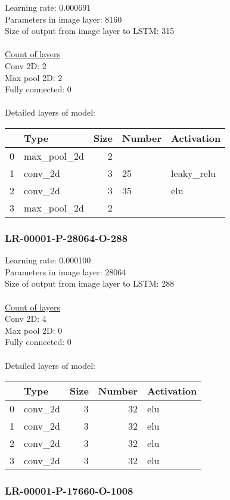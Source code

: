 Learning rate: 0.000691
\\Parameters in image layer: 8160
\\Size of output from image layer to LSTM: 315
\\\\\underline{Count of layers} 
\\Conv 2D:           2\\Max pool 2D:      2\\Fully connected:  0
\\\\Detailed layers of model: \\\begin{tabular}{rlrll}
\hline
    & Type        &   Size & Number   & Activation   \\
\hline
  0 & max\_pool\_2d &      2 &          &              \\
  1 & conv\_2d     &      3 & 25       & leaky\_relu   \\
  2 & conv\_2d     &      3 & 35       & elu          \\
  3 & max\_pool\_2d &      2 &          &              \\
\hline
\end{tabular}\subsubsection*{LR-00001-P-28064-O-288}
Learning rate: 0.000100
\\Parameters in image layer: 28064
\\Size of output from image layer to LSTM: 288
\\\\\underline{Count of layers} 
\\Conv 2D:           4\\Max pool 2D:      0\\Fully connected:  0
\\\\Detailed layers of model: \\\begin{tabular}{rlrrl}
\hline
    & Type    &   Size &   Number & Activation   \\
\hline
  0 & conv\_2d &      3 &       32 & elu          \\
  1 & conv\_2d &      3 &       32 & elu          \\
  2 & conv\_2d &      3 &       32 & elu          \\
  3 & conv\_2d &      3 &       32 & elu          \\
\hline
\end{tabular}\subsubsection*{LR-00001-P-17660-O-1008}
